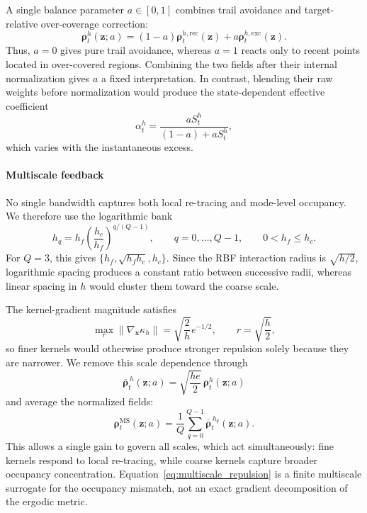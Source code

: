 \documentclass[conference]{IEEEtran}
\begin{document}
{A single balance parameter $a\in[0,1]$ combines trail avoidance and
target-relative over-coverage correction:
\begin{equation}\label{eq:scale_blend}
\boldsymbol\rho_t^h(\mathbf z;a)
=
(1-a)
\boldsymbol\rho_t^{h,\mathrm{rec}}(\mathbf z)
+
a
\boldsymbol\rho_t^{h,\mathrm{exc}}(\mathbf z).
\end{equation}
Thus, $a=0$ gives pure trail avoidance, whereas $a=1$ reacts only to recent
points located in over-covered regions. Combining the two fields after their
internal normalization gives $a$ a fixed interpretation. In contrast, blending
their raw weights before normalization would produce the state-dependent
effective coefficient
\begin{equation}\label{eq:effective_blend}
\alpha_t^h
=
\frac{aS_t^h}{(1-a)+aS_t^h},
\end{equation}
which varies with the instantaneous excess.

\paragraph{Multiscale feedback}
No single bandwidth captures both local re-tracing and mode-level occupancy.
We therefore use the logarithmic bank
\begin{equation}\label{eq:scale_bank}
h_q
=
h_f
\left(\frac{h_c}{h_f}\right)^{q/(Q-1)},
\qquad
q=0,\ldots,Q-1,
\qquad
0<h_f\le h_c.
\end{equation}
For $Q=3$, this gives
$\{h_f,\sqrt{h_fh_c},h_c\}$. Since the RBF interaction radius is
$\sqrt{h/2}$, logarithmic spacing produces a constant ratio between successive
radii, whereas linear spacing in $h$ would cluster them toward the coarse
scale.

The kernel-gradient magnitude satisfies
\begin{equation}
\max_r
\left\|
\nabla_{\mathbf x}\kappa_h
\right\|
=
\sqrt{\frac{2}{h}}e^{-1/2},
\qquad
r=\sqrt{\frac h2},
\end{equation}
so finer kernels would otherwise produce stronger repulsion solely because
they are narrower. We remove this scale dependence through
\begin{equation}\label{eq:scale_gauge}
\overline{\boldsymbol\rho}_t^{\,h}(\mathbf z;a)
=
\sqrt{\frac{he}{2}}\,
\boldsymbol\rho_t^h(\mathbf z;a)
\end{equation}
and average the normalized fields:
\begin{equation}\label{eq:multiscale_repulsion}
\boldsymbol\rho_t^{\mathrm{MS}}(\mathbf z;a)
=
\frac{1}{Q}
\sum_{q=0}^{Q-1}
\overline{\boldsymbol\rho}_t^{\,h_q}(\mathbf z;a).
\end{equation}
This allows a single gain to govern all scales, which act simultaneously:
fine kernels respond to local re-tracing, while coarse kernels capture broader
occupancy concentration. Equation~\eqref{eq:multiscale_repulsion} is a finite
multiscale surrogate for the occupancy mismatch, not an exact gradient
decomposition of the ergodic metric.

}
\end{document}
